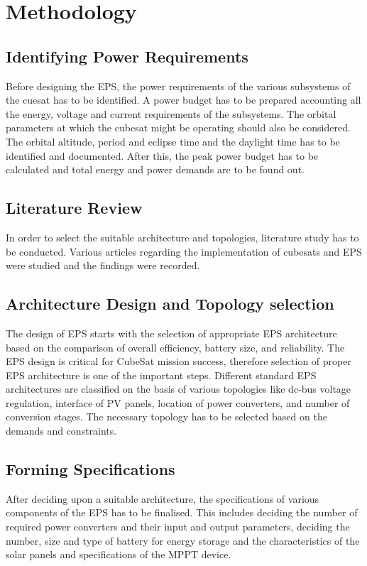 \chapter{Methodology}
\justifying
\section{Identifying Power Requirements}
Before designing the EPS, the power requirements of the various subsystems of the cuesat has to be identified. A power budget has to be prepared accounting all the energy, voltage and current requirements of the subsystems. The orbital parameters at which the cubesat might be operating should also be considered. The orbital altitude, period and eclipse time and the daylight time has to be identified and documented. After this, the peak power budget has to be calculated and total energy and power demands are to be found out.
\section{Literature Review}
In order to select the suitable architecture and topologies, literature study has to be conducted. Various articles regarding the implementation of cubesats and EPS were studied and the findings were recorded.
\section{Architecture Design and Topology selection}
The design of EPS starts with the selection of appropriate EPS architecture based on the comparison of overall efficiency, battery size, and reliability. The EPS design is critical for CubeSat mission success, therefore selection of proper EPS architecture is one of the important steps. Different standard EPS architectures are classified on the basis of various topologies like dc-bus voltage regulation, interface of PV panels, location of power converters, and number of conversion stages. The necessary topology has to be selected based on the demands and constraints.
\section{Forming Specifications}
After deciding upon a suitable architecture, the specifications of various components of the EPS has to be finalised. This includes deciding the number of required power converters and their input and output parameters, deciding the number, size and type of battery for energy storage and the characteristics of the solar panels and specifications of the MPPT device.
